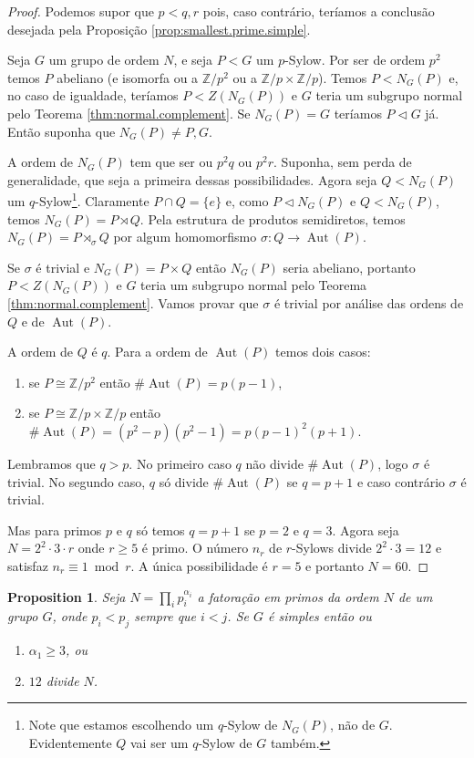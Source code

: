 \documentclass[12pt]{article}
\theoremstyle{plain}
\newtheorem{prop}[thm]{Proposition}
\theoremstyle{definition}
\newcommand{\Z}{\mathbb{Z}}
\newcommand{\al}{\alpha}
\newcommand{\ns}{\vartriangleleft}
\DeclareMathOperator{\Aut}{Aut}
\begin{document}
\begin{proof}
Podemos supor que $p < q, r$ pois, caso contrário, teríamos a conclusão desejada pela Proposição \ref{prop:smallest.prime.simple}.

Seja $G$ um grupo de ordem $N$, e seja $P < G$ um $p$-Sylow. Por ser de ordem $p^2$ temos $P$ abeliano (e isomorfa ou a $\Z/p^2$ ou a $\Z/p \times \Z/p$). Temos $P < N_G(P)$ e, no caso de igualdade, teríamos $P < Z(N_G(P))$ e $G$ teria um subgrupo normal pelo Teorema \ref{thm:normal.complement}. Se $N_G(P) = G$ teríamos $P \ns G$ já. Então suponha que $N_G(P) \neq P, G$.

A ordem de $N_G(P)$ tem que ser ou $p^2 q$ ou $p^2 r$. Suponha, sem perda de generalidade, que seja a primeira dessas possibilidades. Agora seja $Q < N_G(P)$ um $q$-Sylow\footnote{Note que estamos escolhendo um $q$-Sylow de $N_G(P)$, não de $G$. Evidentemente $Q$ vai ser um $q$-Sylow de $G$ também.}. Claramente $P \cap Q = \{e\}$ e, como $P \ns N_G(P)$ e $Q < N_G(P)$, temos $N_G(P) = P \rtimes Q$. Pela estrutura de produtos semidiretos, temos $N_G(P) = P \rtimes_\sigma Q$ por algum homomorfismo $\sigma : Q \rightarrow \Aut(P)$.

Se $\sigma$ é trivial e $N_G(P) = P \times Q$ então $N_G(P)$ seria abeliano, portanto $P < Z(N_G(P))$ e $G$ teria um subgrupo normal pelo Teorema \ref{thm:normal.complement}. Vamos provar que $\sigma$ é trivial por análise das ordens de $Q$ e de $\Aut(P)$.

A ordem de $Q$ é $q$. Para a ordem de $\Aut(P)$ temos dois casos:
\begin{enumerate}
\item se $P \cong \Z/p^2$ então $\# \Aut(P) = p(p-1)$,

\item se $P \cong \Z/p \times \Z/p$ então $\# \Aut(P) = (p^2-p)(p^2-1) = p(p-1)^2(p+1)$.
\end{enumerate}
Lembramos que $q > p$. No primeiro caso $q$ não divide $\# \Aut(P)$, logo $\sigma$ é trivial. No segundo caso, $q$ só divide $\# \Aut(P)$ se $q = p+1$ e caso contrário $\sigma$ é trivial.

Mas para primos $p$ e $q$ só temos $q = p+1$ se $p=2$ e $q=3$. Agora seja $N = 2^2 \cdot 3 \cdot r$ onde $r \geq 5$ é primo. O número $n_r$ de $r$-Sylows divide $2^2 \cdot 3 = 12$ e satisfaz $n_r \equiv 1 \bmod r$. A única possibilidade é $r = 5$ e portanto $N = 60$.
\end{proof}


\begin{prop}
Seja $N = \prod_i p_i^{\al_i}$ a fatoração em primos da ordem $N$ de um grupo $G$, onde $p_i < p_j$ sempre que $i < j$. Se $G$ é simples então ou
\begin{enumerate}
\item $\al_1 \geq 3$, ou

\item $12$ divide $N$.
\end{enumerate}
\end{prop}
\end{document}
